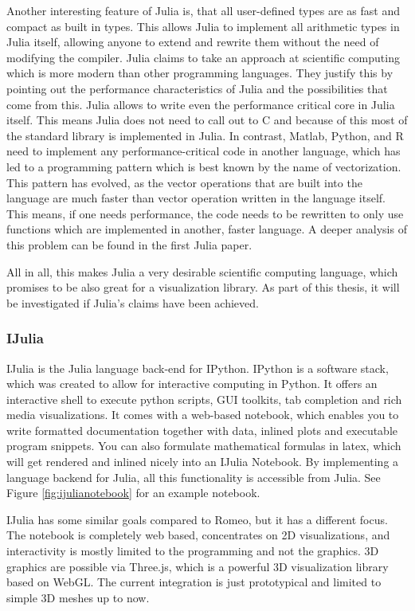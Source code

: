 Another interesting feature of Julia is, that all user-defined types are as fast and compact as built in types.
This allows Julia to implement all arithmetic types in Julia itself, allowing anyone to extend and rewrite them without the need of modifying the compiler.
Julia claims to take an approach at scientific computing which is more modern than other programming languages.
They justify this by pointing out the performance characteristics of Julia and the possibilities that come from this. 
Julia allows to write even the performance critical core in Julia itself. This means Julia does not need to call out to C and because of this most of the standard library is implemented in Julia. 
In contrast, Matlab, Python, and R need to implement any performance-critical code in another language, which has led to a programming pattern which is best known by the name of vectorization. This pattern has evolved, as the vector operations that are built into the language are much faster than vector operation written in the language itself.
This means, if one needs performance, the code needs to be rewritten to only use functions which are implemented in another, faster language.
A deeper analysis of this problem can be found in the first Julia paper\cite{2012arXiv1209.5145B}.

All in all, this makes Julia a very desirable scientific computing language, which promises to be also great for a visualization library.
As part of this thesis, it will be investigated if Julia's claims have been achieved.



\subsubsection{IJulia}
IJulia is the Julia language back-end for IPython.
IPython is a software stack, which was created to allow for interactive computing in Python.
It offers an interactive shell to execute python scripts, \ac{GUI} toolkits, tab completion and rich media visualizations.
It comes with a web-based notebook, which enables you to write formatted documentation together with data, inlined plots and executable program snippets. You can also formulate mathematical formulas in latex, which will get rendered and inlined nicely into an IJulia Notebook. By implementing a language backend for Julia, all this functionality is accessible from Julia.
See Figure \ref{fig:ijulianotebook} for an example notebook.

IJulia has some similar goals compared to Romeo, but it has a different focus.
The notebook is completely web based, concentrates on 2D visualizations, and interactivity is mostly limited to the programming and not the graphics.
3D graphics are possible via Three.js, which is a powerful 3D visualization library based on \ac{WebGL}.
The current integration is just prototypical and limited to simple 3D meshes up to now\cite{Meshes}\cite{Compose3D}.


